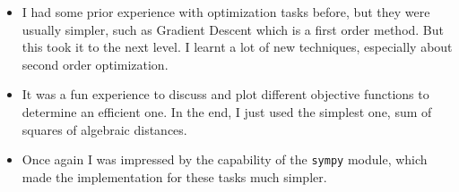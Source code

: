 \documentclass{report}
\begin{document}
\begin{itemize}
    \item I had some prior experience with optimization tasks before, but they were usually simpler, such as Gradient Descent which is a first order method. But this took it to the next level. I learnt a lot of new techniques, especially about second order optimization.
    \item It was a fun experience to discuss and plot different objective functions to determine an efficient one. In the end, I just used the simplest one, sum of squares of algebraic distances.
    \item Once again I was impressed by the capability of the \texttt{sympy} module, which made the implementation for these tasks much simpler.
\end{itemize}

\printbibliography
\end{document}
